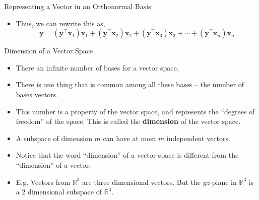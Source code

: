 \documentclass[aspectratio=169]{beamer}
\begin{document}
\begin{frame}[t]{Representing a Vector in an Orthonormal Basis}
  \begin{itemize}
    \item Thus, we can rewrite this as,
    \[ \mathbf{y} = \left(\mathbf{y}^\top\mathbf{x}_1\right)\mathbf{x}_1 + \left(\mathbf{y}^\top\mathbf{x}_2\right)\mathbf{x}_2 + \left(\mathbf{y}^\top\mathbf{x}_3\right)\mathbf{x}_3 + \cdots + \left(\mathbf{y}^\top\mathbf{x}_n\right)\mathbf{x}_n \]
  \end{itemize}
  \begin{center}
  \end{center}
\end{frame}


\begin{frame}[t]{Dimension of a Vector Space}
  \begin{itemize}
    \item There an infinite number of bases for a vector space.
    \item There is one thing that is common among all these bases -- the number of bases vectors.
    \item This number is a property of the vector space, and represents the ``degrees of freedom'' of the space. This is called the \textbf{dimension} of the vector space.
    \item A subspace of dimension $m$ can have at most $m$ independent vectors.
    \item Notice that the word ``dimension'' of a vector space is different from the ``dimension'' of a vector.
    \item E.g. Vectors from $\mathbb{R}^3$ are three dimensional vectors. But the $yz$-plane in $\mathbb{R}^3$ is a 2 dimensional subspace of $\mathbb{R}^3$.
  \end{itemize}
\end{frame}
\end{document}
